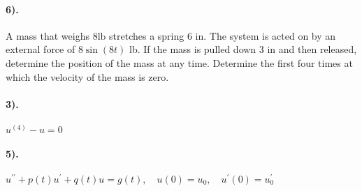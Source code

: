 \documentclass{article}
\begin{document}
\paragraph{6).} A mass that weighs $8 \mathrm{lb}$ stretches a spring 6 in. The system is
acted on by an external force of $8 \sin (8 t)$ lb. If the mass is pulled down
3 in and then released, determine the position of the mass at any time.
Determine the first four times at which the velocity of the mass is zero.
\paragraph{3).}$u^{(4)}-u=0$
\paragraph{5).}$u^{\prime \prime}+p(t) u^{\prime}+q(t) u=g(t), \quad u(0)=u_0,
\quad u^{\prime}(0)=u_0^{\prime}$
\end{document}
